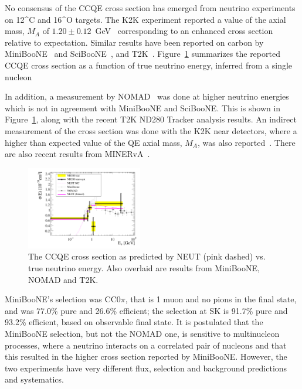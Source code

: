 
No consensus of the CCQE cross section has emerged from neutrino experiments on {12}^C and {16}^O targets. The K2K experiment reported a value of the axial mass, $M_A$ of $1.20 \pm 0.12$~GeV~\cite{Gran:2006jn} corresponding to an enhanced cross section relative to expectation. Similar results have been reported on carbon by MiniBooNE~\cite{AguilarArevalo:2010zc} and SciBooNE~\cite{sciboone-nuint2011}, and T2K~\cite{Abe:2014iza}. Figure~\ref{fig:ccqe} summarizes the reported CCQE cross section as a function of true neutrino energy, inferred from a single nucleon



 In addition, a measurement by NOMAD~\cite{Lyubushkin:2008pe} was done at higher neutrino energies which is not in agreement with MiniBooNE and SciBooNE. This is shown in Figure~\ref{fig:ccqe}, along with the recent T2K ND280 Tracker analysis results. An indirect measurement of the cross section was done with the K2K near detectors, where a higher than expected value of the QE axial mass, $M_A$, was also reported~\cite{Gran:2006jn}. There are also recent results from MINERvA~\cite{Fiorentini:2013ezn}.

\begin{figure}[htpb]
\begin{center}
      \includegraphics[width=0.45\textwidth] {figures/nd280_miniboone_nomad.png}
\end{center}
\caption{The CCQE cross section as predicted by NEUT (pink dashed) vs. true neutrino energy. Also overlaid are results from MiniBooNE, NOMAD and T2K.}
\label{fig:ccqe}
\end{figure}


MiniBooNE's selection was CC0$\pi$, that is 1 muon and no pions in the final state, and was 77.0\% pure and 26.6\% efficient; the \rmu selection at SK is 91.7\% pure  and 93.2\% efficient, based on observable final state.
It is postulated that the MiniBooNE selection, but not the NOMAD one, is sensitive to multinucleon processes, where a neutrino interacts on a correlated pair of nucleons and that this resulted in the higher cross section reported by MiniBooNE. However, the two experiments have very different flux, selection and background predictions and systematics.


